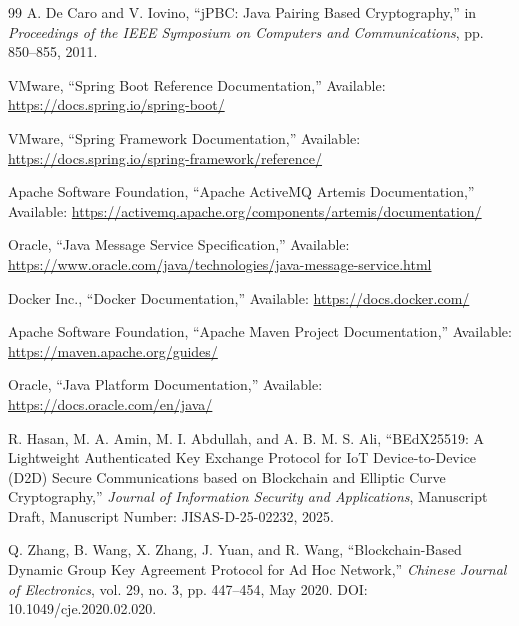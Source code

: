 \documentclass[12pt,a4paper]{report}
\begin{document}
\begin{thebibliography}{99}
A. De Caro and V. Iovino,
``jPBC: Java Pairing Based Cryptography,''
in \textit{Proceedings of the IEEE Symposium on Computers and Communications},
pp. 850--855, 2011.

VMware,
``Spring Boot Reference Documentation,''
Available: \url{https://docs.spring.io/spring-boot/}

VMware,
``Spring Framework Documentation,''
Available: \url{https://docs.spring.io/spring-framework/reference/}

Apache Software Foundation,
``Apache ActiveMQ Artemis Documentation,''
Available: \url{https://activemq.apache.org/components/artemis/documentation/}

Oracle,
``Java Message Service Specification,''
Available: \url{https://www.oracle.com/java/technologies/java-message-service.html}

Docker Inc.,
``Docker Documentation,''
Available: \url{https://docs.docker.com/}

Apache Software Foundation,
``Apache Maven Project Documentation,''
Available: \url{https://maven.apache.org/guides/}

Oracle,
``Java Platform Documentation,''
Available: \url{https://docs.oracle.com/en/java/}

R. Hasan, M. A. Amin, M. I. Abdullah, and A. B. M. S. Ali,
``BEdX25519: A Lightweight Authenticated Key Exchange Protocol for IoT Device-to-Device (D2D) Secure Communications based on Blockchain and Elliptic Curve Cryptography,''
\textit{Journal of Information Security and Applications},
Manuscript Draft, Manuscript Number: JISAS-D-25-02232, 2025.

Q. Zhang, B. Wang, X. Zhang, J. Yuan, and R. Wang,
``Blockchain-Based Dynamic Group Key Agreement Protocol for Ad Hoc Network,''
\textit{Chinese Journal of Electronics},
vol. 29, no. 3, pp. 447--454, May 2020.
DOI: 10.1049/cje.2020.02.020.

\end{thebibliography}
\end{document}
